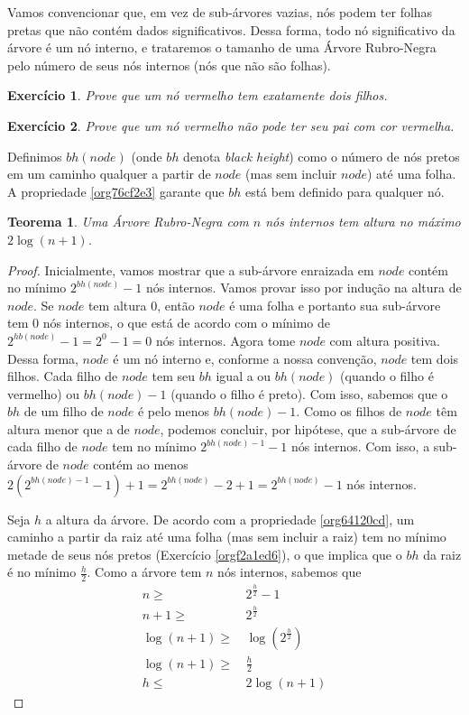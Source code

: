 \documentclass[11pt]{article}
\newtheorem{exercicio}{Exercício}
\newtheorem{theorem}{Teorema}
\begin{document}
Vamos convencionar que, em vez de sub-árvores vazias, nós podem
ter folhas pretas que não contém dados significativos.  Dessa
forma, todo nó significativo da árvore é um nó interno, e
trataremos o tamanho de uma Árvore Rubro-Negra pelo número de seus
nós internos (nós que não são folhas).

\begin{exercicio}
Prove que um nó vermelho tem exatamente dois filhos.
\end{exercicio}

\begin{exercicio}
Prove que um nó vermelho não pode ter seu pai com cor vermelha.
\end{exercicio}

Definimos \(bh(node)\) (onde \(bh\) denota \emph{black height}) como o
número de nós pretos em um caminho qualquer a partir de \(node\)
(mas sem incluir \(node\)) até uma folha.  A propriedade
\ref{org76cf2e3} garante que \(bh\) está bem definido para
qualquer nó.

\begin{theorem}
\label{org96b101c}
Uma Árvore Rubro-Negra com \(n\) nós internos tem altura no máximo
\(2\log (n + 1)\).
\end{theorem}

\begin{proof}
Inicialmente, vamos mostrar que a sub-árvore enraizada em \(node\)
contém no mínimo \(2^{bh(node)} - 1\) nós internos.  Vamos provar
isso por indução na altura de \(node\).  Se \(node\) tem altura \(0\),
então \(node\) é uma folha e portanto sua sub-árvore tem \(0\) nós
internos, o que está de acordo com o mínimo de \(2^{hb(node)} - 1 =
    2^0 - 1 = 0\) nós internos.  Agora tome \(node\) com altura positiva.
Dessa forma, \(node\) é um nó interno e, conforme a nossa convenção,
\(node\) tem dois filhos.  Cada filho de \(node\) tem seu \(bh\) igual a
ou \(bh(node)\) (quando o filho é vermelho) ou \(bh(node) - 1\)
(quando o filho é preto).  Com isso, sabemos que o \(bh\) de um
filho de \(node\) é pelo menos \(bh(node) - 1\).  Como os filhos de
\(node\) têm altura menor que a de \(node\), podemos concluir, por
hipótese, que a sub-árvore de cada filho de \(node\) tem no mínimo
\(2^{bh(node) - 1} - 1\) nós internos.  Com isso, a sub-árvore de
\(node\) contém ao menos \(2(2^{bh(node) - 1} - 1) + 1 =
    2^{bh(node)} - 2 + 1 = 2^{bh(node)} - 1\) nós internos.

Seja \(h\) a altura da árvore.  De acordo com a propriedade
\ref{org64120cd}, um caminho a partir da raiz até uma folha
(mas sem incluir a raiz) tem no mínimo metade de seus nós pretos
(Exercício \ref{orgf2a1ed6}), o que implica que o \(bh\) da
raiz é no mínimo \(\frac{h}{2}\).  Como a árvore tem \(n\) nós
internos, sabemos que
\begin{align}
n \geq            &\, 2^{\frac{h}{2}} - 1 \\
n + 1 \geq        &\, 2^{\frac{h}{2}} \\
\log (n + 1) \geq &\, \log (2^{\frac{h}{2}}) \\
\log (n + 1) \geq &\, \frac{h}{2} \\
h \leq            &\, 2\log (n + 1)
\end{align}
\end{proof}
\end{document}
